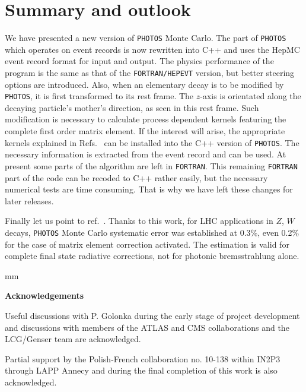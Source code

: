 \documentclass[]{Photos_interface_design}
\begin{document}
\section{Summary and outlook}
\label{sec:summary}
We have presented a new version  of {\tt PHOTOS} Monte Carlo. The part of 
{\tt PHOTOS} which operates on 
event records is now rewritten into C++ and uses the HepMC event record 
format for input and output. The physics performance of the program is the
same as that of the {\tt FORTRAN/HEPEVT} version, but better steering options are introduced. 
Also, when an elementary decay is to be modified by {\tt PHOTOS}, 
it is first transformed to its rest frame. The $z$-axis is orientated along the decaying particle's mother's direction, as seen in this rest  frame. Such modification is 
necessary to calculate process dependent kernels
featuring the complete first order matrix element. If the interest will arise,
the appropriate kernels explained in
Refs.~\cite{Golonka:2006tw,Nanava:2006vv,Nanava:2009vg} can be installed
into the C++ version of {\tt PHOTOS}. The necessary information is extracted
from the event record and can be used.
At present some parts of the algorithm are left in {\tt FORTRAN}.
 This remaining {\tt FORTRAN} part of the code 
can be recoded to C++ rather easily, but the necessary numerical tests 
are time consuming. That is why we have left these changes for later 
releases. 

{Finally let us point to ref.~\cite{Arbuzov:2012dx}. Thanks to this work, for LHC applications in $Z$, $W$ decays,
{\tt PHOTOS} Monte Carlo systematic error was established at  0.3\%, even   0.2\% for the case of matrix element correction activated. The estimation is valid
for complete final state radiative corrections, not for photonic bremsstrahlung
alone.
}

 mm

\centerline{\large\bf Acknowledgements}


Useful discussions with P. Golonka during the early stage of project development and discussions 
with members of the ATLAS and CMS collaborations and the LCG/Genser team 
are acknowledged.


Partial support by the Polish-French collaboration
no. 10-138 within IN2P3 through LAPP Annecy and 
during the final completion of this work is
also acknowledged.



{}
% 

\end{document}
